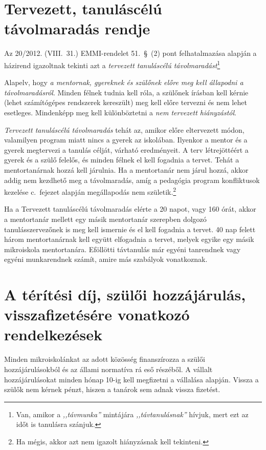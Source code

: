 \documentclass{article}
\begin{document}
\section{Tervezett, tanuláscélú távolmaradás rendje}
Az 20/2012. (VIII.~31.) EMMI-rendelet 51.~§~(2) pont felhatalmazása alapján a házirend igazoltnak tekinti azt a \emph{tervezett tanuláscélú távolmaradást}\footnote{Van, amikor a \emph{,,távmunka''} mintájára \emph{,,távtanulásnak''} hívjuk, mert ezt az időt is tanulásra szánjuk.}

Alapelv, hogy \emph{a mentornak, gyereknek és szülőnek előre meg kell állapodni a távolmaradásról}. Minden félnek tudnia kell róla, a szülőnek írásban kell kérnie (lehet számítógépes rendszerek kereszült) meg kell előre tervezni és nem lehet esetleges. Mindenképp meg kell különböztetni a \emph{nem tervezett hiányzástól}.

\emph{Tervezett tanuláscélú távolmaradás} tehát az, amikor előre eltervezett módon, valamilyen program miatt nincs a gyerek az iskolában. Ilyenkor a mentor és a gyerek megtervezi a tanulás célját, várható eredményeit. A terv létrejöttéért a gyerek és a szülő felelős, és minden félnek el kell fogadnia a tervet. Tehát a mentortanárnak hozzá kell járulnia. Ha a mentortanár nem járul hozzá, akkor addig nem kezdhető meg a távolmaradás, amíg a pedagógia program konfliktusok kezelése c.~fejezet alapján megállapodás nem születik.\footnote{Ha mégis, akkor azt nem igazolt hiányzásnak kell tekinteni.}

Ha a Tervezett tanuláscélú távolmaradás elérte a 20 napot, vagy 160 órát, akkor a mentortanár mellett egy másik mentortanár szerepben dolgozó tanulásszervezőnek is meg kell ismernie és el kell fogadnia a tervet. 40 nap felett három mentortanárnak kell együtt elfogadnia a tervet, melyek egyike egy másik mikroiskola mentortanára. Eföllötti távtanulás már egyéni tanrendnek vagy egyéni munkarendnek számít, amire más szabályok vonatkoznak.

\section{A térítési díj, szülői hozzájárulás, visszafizetésére vonatkozó rendelkezések}

Minden mikroiskolánkat az adott közösség finanszírozza a szülői hozzájárulásokból és az állami normatíva rá eső részéből. A vállalt hozzájárulásokat minden hónap 10-ig kell megfizetni a vállalása alapján. Vissza a szülők nem kérnek pénzt, hiszen a tanárok sem adnak vissza fizetést.
\end{document}
